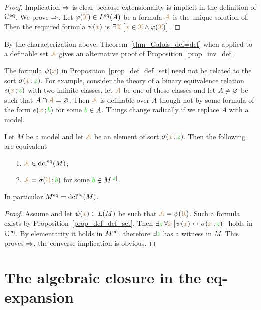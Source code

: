 \documentclass[creche.tex]{subfiles}
\begin{document}
\begin{proof}
Implication $\Rightarrow$ is clear because extensionality is implicit in the definition of $\EuScript U^{{\rm eq}}$. We prove $\Rightarrow$. Let $\varphi({\color{brown}\EuScript X})\in L^{{\rm eq}}(A)$ be a formula ${\color{brown}\EuScript A}$ is the unique solution of. Then the required formula $\psi({\color{brown} x})$ is $\exists {\color{brown}\EuScript X}\,\big[{\color{brown} x}\in {\color{brown}\EuScript X}\wedge\varphi({\color{brown}\EuScript X})\big]$.
\end{proof}

By the characterization above, Theorem~\ref{thm_Galois_def=def} when applied to a definable set ${\color{brown}\EuScript A}$ gives an alternative proof of Proposition~\ref{prop_inv_def}.

The formula $\psi({\color{brown} x})$ in Proposition~\ref{prop_def_def_set} need not be related to the sort $\sigma({\color{brown} x}\,;{\color{green} z})$. For example, consider the theory of a binary equivalence relation $e({\color{brown} x}\,;{\color{green} z})$ with two infinite classes, let ${\color{brown}\EuScript A}$ be one of these classes and let $A\neq\varnothing$ be such that $A\cap {\color{brown}\EuScript A}=\varnothing$. Then ${\color{brown}\EuScript A}$ is definable over $A$ though not by some formula of the form $e({\color{brown} x}\,;{\color{green} b})$ for some ${\color{green} b}\in A$. Things change radically if we replace $A$ with a model.  


\begin{proposition}\label{prop_standard_def_set}
Let $M$ be a model and let ${\color{brown}\EuScript A}$ be an element of sort $\sigma({\color{brown} x}\,;{\color{green} z})$. Then the following are equivalent
\begin{itemize}
\item[1.]  ${\color{brown}\EuScript A}\in\mathop{\rm dcl}^{{\rm eq}}(M)$; 
\item[2.]  ${\color{brown}\EuScript A}=\sigma({\color{brown}\EuScript U}\,;{\color{green} b})$ for some ${\color{green} b}\in M^{|{\color{green} z}|}$.
\end{itemize}
In particular $M^{{\rm eq}}=\mathop{\rm dcl}^{{\rm eq}}(M)$.
\end{proposition}

\begin{proof}
Assume  and let $\psi({\color{brown} x})\in L(M)$ be such that ${\color{brown}\EuScript A}=\psi({\color{brown}\EuScript U})$. Such a formula exists by Proposition~\ref{prop_def_def_set}. Then $\exists{\color{green}z}\,\forall{\color{brown}x}\,\big[\psi({\color{brown} x})\leftrightarrow\sigma({\color{brown} x}\,;{\color{green} z})\big]$ holds in $\EuScript U^{{\rm eq}}$. By elementarity it holds in $M^{{\rm eq}}$, therefore $\exists{\color{green}z}$ has a witness in $M$. This proves $\Rightarrow$, the converse implication is obvious.
\end{proof}

\section{The algebraic closure in the eq-expansion}
\end{document}
